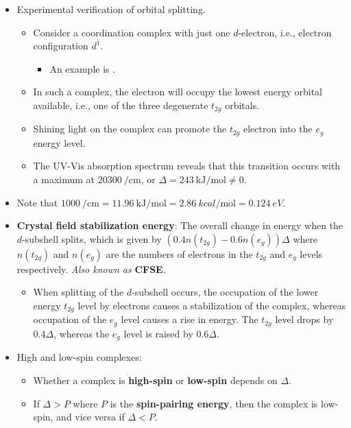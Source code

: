 \documentclass[../notes.tex]{subfiles}
\begin{document}
\begin{itemize}
    \item Experimental verification of orbital splitting.
    \begin{itemize}
        \item Consider a coordination complex with just one $d$-electron, i.e., electron configuration $d^1$.
        \begin{itemize}
            \item An example is .
        \end{itemize}
        \item In such a complex, the electron will occupy the lowest energy orbital available, i.e., one of the three degenerate $t_{2g}$ orbitals.
        \item Shining light on the complex can promote the $t_{2g}$ electron into the $e_g$ energy level.
        \item The UV-Vis absorption spectrum reveals that this transition occurs with a maximum at $\SI{20300}{\per\centi\meter}$, or $\Delta=\SI[per-mode=symbol]{243}{\kilo\joule\per\mole}\neq 0$.
    \end{itemize}
    \item Note that $\SI{1000}{\per\centi\metre}=\SI[per-mode=symbol]{11.96}{\kilo\joule\per\mole}=\SI[per-mode=symbol]{2.86}{kcal\per\mole}=\SI{0.124}{eV}$.
    \item \textbf{Crystal field stabilization energy}: The overall change in energy when the $d$-subshell splits, which is given by $(0.4n(t_{2g})-0.6n(e_g))\Delta$ where $n(t_{2g})$ and $n(e_g)$ are the numbers of electrons in the $t_{2g}$ and $e_g$ levels respectively. \emph{Also known as} \textbf{CFSE}.
    \begin{itemize}
        \item When splitting of the $d$-subshell occurs, the occupation of the lower energy $t_{2g}$ level by electrons causes a stabilization of the complex, whereas occupation of the $e_g$ level causes a rise in energy. The $t_{2g}$ level drops by $0.4\Delta$, whereas the $e_g$ level is raised by $0.6\Delta$.
    \end{itemize}
    \item High and low-spin complexes:
    \begin{itemize}
        \item Whether a complex is \textbf{high-spin} or \textbf{low-spin} depends on $\Delta$.
        \item If $\Delta>P$ where $P$ is the \textbf{spin-pairing energy}, then the complex is low-spin, and vice versa if $\Delta<P$.

\end{itemize}
\end{itemize}
\end{document}
